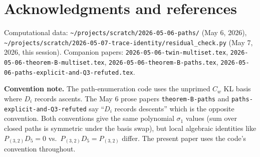 \documentclass[11pt]{article}
\theoremstyle{definition}
\begin{document}
\section*{Acknowledgments and references}

Computational data: \texttt{\textasciitilde/projects/scratch/2026-05-06-paths/} (May 6, 2026), \texttt{\textasciitilde/projects/scratch/2026-05-07-trace-identity/residual\_check.py} (May 7, 2026, this session). Companion papers: \texttt{2026-05-06-twin-multiset.tex}, \texttt{2026-05-06-theorem-B-multiset.tex}, \texttt{2026-05-06-theorem-B-paths.tex}, \texttt{2026-05-06-paths-explicit-and-Q3-refuted.tex}.

\textbf{Convention note.} The path-enumeration code uses the unprimed $C_w$ KL basis where $D_i$ records ascents. The May 6 prose papers \texttt{theorem-B-paths} and \texttt{paths-explicit-and-Q3-refuted} say ``$D_i$ records descents'' which is the opposite convention. Both conventions give the same polynomial $\sigma_1$ values (sum over closed paths is symmetric under the basis swap), but local algebraic identities like $P_{(3,2)} D_5 = 0$ vs.\ $P_{(3,2)} D_5 = P_{(3,2)}$ differ. The present paper uses the code's convention throughout.
\end{document}
